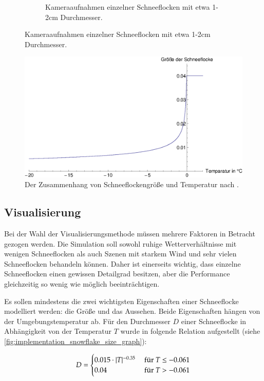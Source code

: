 \begin{figure}
\begin{subfigure}[t]{0.45\textwidth}
            \caption{Kameraaufnahmen einzelner Schneeflocken mit etwa 1-2cm Durchmesser\cite{Hanesch1966}.}
            \label{fig:implementation_real_snowflakes}
    \end{subfigure}
\end{figure}

\begin{figure}[ht]
\centering
\includegraphics[width=14cm]{images/snowflake_size_graph}
\caption{Der Zusammenhang von Schneeflockengröße und Temperatur nach \cite{Jun00}.}
\label{fig:implementation_snowflake_size_graph}
\end{figure}

\subsection{Visualisierung}

Bei der Wahl der Visualisierungsmethode müssen mehrere Faktoren in
Betracht gezogen werden. Die Simulation soll sowohl ruhige
Wetterverhältnisse mit wenigen Schneeflocken als auch Szenen mit
starkem Wind und sehr vielen Schneeflocken behandeln können. Daher ist
einerseits wichtig, dass einzelne Schneeflocken einen gewissen
Detailgrad besitzen, aber die Performance gleichzeitig so wenig wie
möglich beeinträchtigen.

Es sollen mindestens die zwei wichtigsten Eigenschaften einer
Schneeflocke modelliert werden: die Größe und das Aussehen. Beide
Eigenschaften hängen von der Umgebungstemperatur ab. Für den Durchmesser $D$
einer Schneeflocke in Abhängigkeit von der Temperatur $T$ wurde in
\cite{Jun00} folgende Relation aufgestellt (siehe
\autoref{fig:implementation_snowflake_size_graph}):

\begin{equation}
\label{eq:implementation_snowflake_diameter}
D =
\begin{cases}
0.015 \cdot |T|^{-0.35} & \textnormal{ für }T \leq -0.061 \\
0.04 & \textnormal{ für }T > -0.061
\end{cases}
\end{equation}

